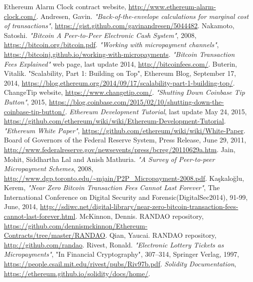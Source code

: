 \documentclass[a4paper]{article}
\begin{document}
\begin{thebibliography}{9}
 Ethereum Alarm Clock contract website, \url{http://www.ethereum-alarm-clock.com/}.
 Andresen, Gavin. \textit{"Back-of-the-envelope calculations for marginal cost of transactions"},
    \url{https://gist.github.com/gavinandresen/5044482}.
 Nakamoto, Satoshi. \textit{"Bitcoin A Peer-to-Peer Electronic Cash System"}, 2008,
    \url{https://bitcoin.org/bitcoin.pdf}.
 \textit{"Working with micropayment channels"},
    \url{https://bitcoinj.github.io/working-with-micropayments}.
 \textit{"Bitcoin Transaction Fees Explained"} web page, last update 2014, \url{http://bitcoinfees.com/}.
 Buterin, Vitalik. "Scalability, Part 1: Building on Top", Ethereum Blog, September 17, 2014,
    \url{https://blog.ethereum.org/2014/09/17/scalability-part-1-building-top/}.
 ChangeTip website, \url{https://www.changetip.com/}.
 \textit{"Shutting Down Coinbase Tip Button"}, 2015,
    \url{https://blog.coinbase.com/2015/02/10/shutting-down-the-coinbase-tip-button/}.
 \textit{Ethereum Development Tutorial}, last update May 24, 2015,
    \url{https://github.com/ethereum/wiki/wiki/Ethereum-Development-Tutorial}.
 \textit{"Ethereum White Paper"}, \url{https://github.com/ethereum/wiki/wiki/White-Paper}.
 Board of Governors of the Federal Reserve System, Press Release, June 29, 2011,
    \url{http://www.federalreserve.gov/newsevents/press/bcreg/20110629a.htm}.
 Jain, Mohit, Siddhartha Lal and Anish Mathuria. \textit{"A Survey of Peer-to-peer Micropayment Schemes},
    2008, \url{http://www.dgp.toronto.edu/~mjain/P2P_Micropayment-2008.pdf}.
Kaşkaloğlu, Kerem, \textit{"Near Zero Bitcoin Transaction Fees Cannot Last Forever"},
    The International Conference on Digital Security and Forensic(DigitalSec2014), 91-99, June, 2014,
    \url{http://sdiwc.net/digital-library/near-zero-bitcoin-transaction-fees-cannot-last-forever.html}.
 McKinnon, Dennis. RANDAO repository,
    \url{https://github.com/dennismckinnon/Ethereum-Contracts/tree/master/RANDAO}.
 Qian, Yaucai. RANDAO repository, \url{http://github.com/randao}.
 Rivest, Ronald. \textit{"Electronic Lottery Tickets as Micropayments"},
    "In Financial Cryptography", 307--314, Springer Verlag, 1997,
    \url{https://people.csail.mit.edu/rivest/pubs/Riv97b.pdf}.
 \textit{Solidity Documentation}, \url{https://ethereum.github.io/solidity/docs/home/}.

\end{thebibliography}
\end{document}
